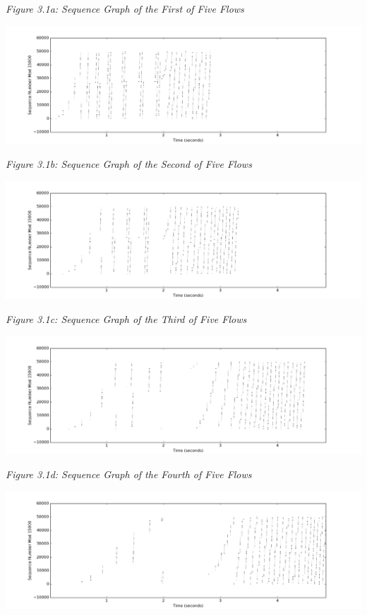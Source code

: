 \documentclass[11pt]{article}
\begin{document}
\centerline{\emph{Figure 3.1a: Sequence Graph of the First of Five Flows}}

\includegraphics[width=17cm]{outputs/fiveflows/fiveflows_sequence2000.png}

\centerline{\emph{Figure 3.1b: Sequence Graph of the Second of Five Flows}}

\includegraphics[width=17cm]{outputs/fiveflows/fiveflows_sequence3000.png}

\centerline{\emph{Figure 3.1c: Sequence Graph of the Third of Five Flows}}

\includegraphics[width=17cm]{outputs/fiveflows/fiveflows_sequence4000.png}

\centerline{\emph{Figure 3.1d: Sequence Graph of the Fourth of Five Flows}}

\includegraphics[width=17cm]{outputs/fiveflows/fiveflows_sequence5000.png}
\end{document}
